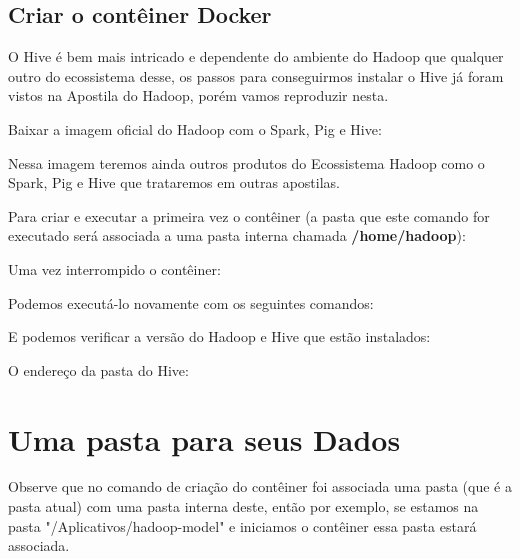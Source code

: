 \documentclass[a4paper,11pt]{article}
\begin{document}
\subsection{Criar o contêiner Docker}
O Hive é bem mais intricado e dependente do ambiente do Hadoop que qualquer outro do ecossistema desse, os passos para conseguirmos instalar o Hive já foram vistos na Apostila do Hadoop, porém vamos reproduzir nesta.

Baixar a imagem oficial do Hadoop com o Spark, Pig e Hive: \\

Nessa imagem teremos ainda outros produtos do Ecossistema Hadoop como o Spark, Pig e Hive que trataremos em outras apostilas.

Para criar e executar a primeira vez o contêiner (a pasta que este comando for executado será associada a uma pasta interna chamada \textbf{/home/hadoop}): \\

Uma vez interrompido o contêiner: \\

Podemos executá-lo novamente com os seguintes comandos: \\

E podemos verificar a versão do Hadoop e Hive que estão instalados: \\

O endereço da pasta do Hive: \\

\section{Uma pasta para seus Dados}
Observe que no comando de criação do contêiner foi associada uma pasta (que é a pasta atual) com uma pasta interna deste, então por exemplo, se estamos na pasta "/Aplicativos/hadoop-model" e iniciamos o contêiner essa pasta estará associada.
\end{document}
